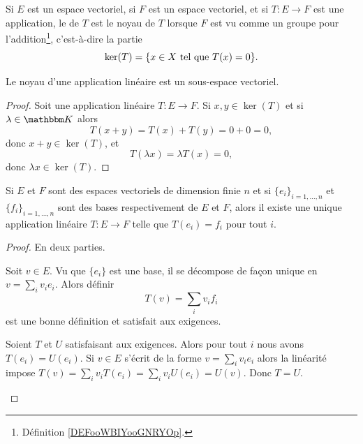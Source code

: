 \begin{definition}
    Si \( E\) est un espace vectoriel, si \( F\) est un espace vectoriel, et si \( T\colon E \to F \) est une application, le  de \( T\) est le noyau de \( T\) lorsque \( F\) est vu comme un groupe pour l'addition\footnote{Définition \ref{DEFooWBIYooGNRYOp}.}, c'est-à-dire la partie
    \begin{equation}
        \ker(T)=\{ x\in X\text{ tel que } T(x)=0 \}.
    \end{equation}
\end{definition}

\begin{proposition}     \label{PROPooRLLPooKYzsJp}
    Le noyau d'une application linéaire est un sous-espace vectoriel.
\end{proposition}

\begin{proof}
    Soit une application linéaire \( T\colon E\to F\). Si \( x,y\in \ker(T)\) et si \( \lambda\in \eK\) alors
    \begin{equation}
        T(x+y)=T(x)+T(y)=0+0=0,
    \end{equation}
    donc \( x+y\in \ker(T)\), et
    \begin{equation}
        T(\lambda x)=\lambda T(x)=0,
    \end{equation}
    donc \( \lambda x\in \ker(T)\).
\end{proof}

\begin{proposition}
    Si \( E\) et \( F\) sont des espaces vectoriels de dimension finie \( n\) et si \( \{ e_i \}_{i=1,\ldots, n}\) et \( \{ f_i \}_{i=1,\ldots, n}\) sont des bases respectivement de \( E\) et \( F\), alors il existe une unique application linéaire \( T\colon E\to F\) telle que \( T(e_i)=f_i\) pour tout \( i\).
\end{proposition}

\begin{proof}
    En deux parties.\begin{subproof}
        \item[Existence]
            Soit \( v\in E\). Vu que \( \{ e_i \}\) est une base, il se décompose de façon unique en \( v=\sum_iv_ie_i\). Alors définir
            \begin{equation}
                T(v)=\sum_iv_if_i
            \end{equation}
            est une bonne définition et satisfait aux exigences.
        \item[Unicité]
            Soient \( T\) et \( U\) satisfaisant aux exigences. Alors pour tout \( i\) nous avons \( T(e_i)=U(e_i)\). Si \( v\in E\) s'écrit de la forme \( v=\sum_iv_ie_i\) alors la linéarité impose \( T(v)=\sum_iv_iT(e_i)=\sum_iv_iU(e_i)=U(v)\). Donc \( T = U\).
    \end{subproof}
\end{proof}

